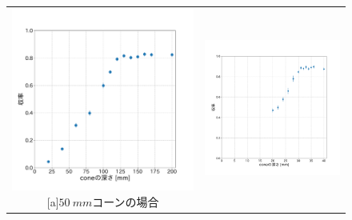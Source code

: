 \begin{figure}[htbp]
  \begin{tabular}{cc}
    \begin{minipage}[t]{0.45\hsize}
      \centering
      \includegraphics[keepaspectratio, scale=0.3]{images/chapter3/cone50_optimize.pdf}
      [a]$\SI{50}{mm}$コーンの場合
    \end{minipage} &
    \begin{minipage}[t]{0.45\hsize}
      \centering
      \includegraphics[keepaspectratio, scale=0.3]{images/chapter3/cone30_optimize.pdf}

\end{minipage}
\end{tabular}
\end{figure}
